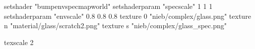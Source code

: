 setshader "bumpenvspecmapworld"
setshaderparam "specscale" 1 1 1
setshaderparam "envscale"  0.8 0.8 0.8
   texture 0 "nieb/complex/glass.png"
   texture n "material/glass/scratch2.png"
   texture s "nieb/complex/glass_spec.png"

texscale 2
